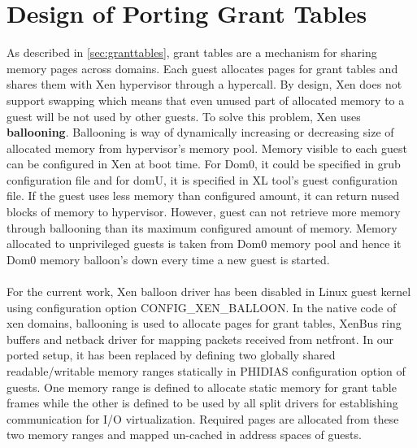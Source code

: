 \section{Design of Porting Grant Tables\label{sec:granttablesstatic}}
As described in \ref{sec:granttables}, grant tables are a mechanism for sharing memory pages across domains. Each guest allocates pages for grant tables and shares them with Xen hypervisor through a hypercall. By design, Xen does not support swapping which means that even unused part of allocated memory to a guest will be not used by other guests. To solve this problem, Xen uses \textbf{ballooning}. Ballooning is way of dynamically increasing or decreasing size of allocated memory from hypervisor's memory pool. Memory visible to each guest can be configured in Xen at boot time. For Dom0, it could be specified in grub configuration file and for domU, it is specified in XL tool's guest configuration file. If the guest uses less memory than configured amount, it can return nused blocks of memory to hypervisor. However, guest can not retrieve more memory through ballooning than its maximum configured amount of memory. Memory allocated to unprivileged guests is taken from Dom0 memory pool and hence it Dom0 memory balloon's down every time a new guest is started.
\\
\\
For the current work, Xen balloon driver has been disabled in Linux guest kernel using configuration option CONFIG\_XEN\_BALLOON. In the native code of xen domains, ballooning is used to allocate pages for grant tables, XenBus ring buffers and netback driver for mapping packets received from netfront. In our ported setup, it has been replaced by defining two globally shared readable/writable memory ranges statically in PHIDIAS configuration option of guests. One memory range is defined to allocate static memory for grant table frames while the other is defined to be used by all split drivers for establishing communication for I/O virtualization. Required pages are allocated from these two memory ranges and mapped un-cached in address spaces of guests.

